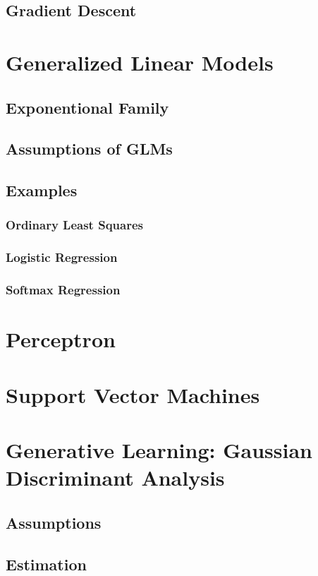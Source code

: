 \documentclass[twoside,twocolumn]{article}
\begin{document}
\subsection{Gradient Descent}
\section{Generalized Linear Models}
\subsection{Exponentional Family}
\subsection{Assumptions of GLMs}
\subsection{Examples}
\subsubsection{Ordinary Least Squares}
\subsubsection{Logistic Regression}
\subsubsection{Softmax Regression}
\section{Perceptron}
\section{Support Vector Machines}
\section{Generative Learning: Gaussian Discriminant Analysis}
\subsection{Assumptions}
\subsection{Estimation}
\end{document}
